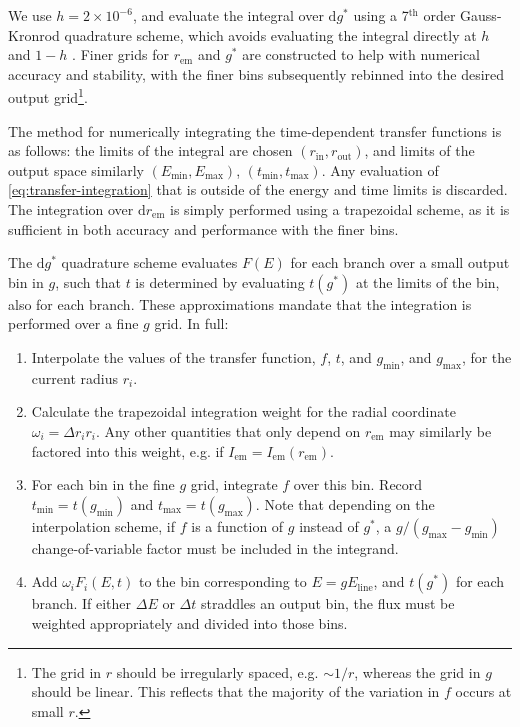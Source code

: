 \documentclass[fleqn,usenatbib]{mnras}
\renewcommand{\d}{\text{d}}
\begin{document}
We use $h = 2 \times 10^{-6}$, and evaluate the integral over $\d g^\ast$ using a 7$^\text{th}$ order Gauss-Kronrod quadrature scheme, which avoids evaluating the integral directly at $h$ and $1 - h$ \citep{}. Finer grids for $r_\text{em}$ and $g^\ast$ are constructed to help with numerical accuracy and stability, with the finer bins subsequently rebinned into the desired output grid\footnote{The grid in $r$ should be irregularly spaced, e.g. $\sim 1 / r$, whereas the grid in $g$ should be linear. This reflects that the majority of the variation in $f$ occurs at small $r$.}.

The method for numerically integrating the time-dependent transfer functions is as follows: the limits of the integral are chosen $(r_\text{in}, r_\text{out})$, and limits of the output space similarly $(E_\text{min}, E_\text{max})$, $(t_\text{min}, t_\text{max})$. Any evaluation of \eqref{eq:transfer-integration} that is outside of the energy and time limits is discarded.  The integration over $\d r_\text{em}$ is simply performed using a trapezoidal scheme, as it is sufficient in both accuracy and performance with the finer bins.

The $\d g^\ast$ quadrature scheme evaluates $F(E)$ for each branch over a small output bin in $g$, such that $t$ is determined by evaluating $t(g^\ast)$ at the limits of the bin, also for each branch. These approximations mandate that the integration is performed over a fine $g$ grid. In full:
\begin{enumerate}
    \item Interpolate the values of the transfer function, $f$, $t$, and $g_\text{min}$, and $g_\text{max}$, for the current radius $r_i$.
    \item Calculate the trapezoidal integration weight for the radial coordinate $\omega_i = \Delta r_i r_i$. Any other quantities that only depend on $r_\text{em}$ may similarly be factored into this weight, e.g. if $I_\text{em} = I_\text{em}(r_\text{em})$.
    \item For each bin in the fine $g$ grid, integrate $f$ over this bin. Record $t_\text{min} = t(g_\text{min})$ and $t_\text{max} = t(g_\text{max})$. Note that depending on the interpolation scheme, if $f$ is a function of $g$ instead of $g^\ast$, a $g / (g_\text{max} - g_\text{min})$ change-of-variable factor must be included in the integrand.
    \item Add $\omega_i F_i(E, t)$ to the bin corresponding to $E = gE_\text{line}$, and $t(g^\ast)$ for each branch. If either $\Delta E$ or $\Delta t$ straddles an output bin, the flux must be weighted appropriately and divided into those bins.
\end{enumerate}
\end{document}
